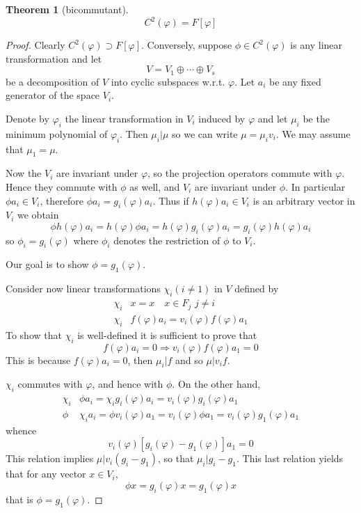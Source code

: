 \documentclass{book}
\newtheorem{theorem}{Theorem}[section]
\theoremstyle{definition}
\begin{document}
\begin{theorem}[bicommutant]
\[C^2(\varphi)=F[\varphi]\]
\end{theorem}
\begin{proof}
Clearly $C^2(\varphi)\supset F[\varphi]$. Conversely, suppose $\phi\in C^2(\varphi)$ is any linear transformation and let \[ V=V_1\oplus \cdots\oplus V_s\] be a decomposition of $V$ into cyclic subspaces w.r.t. $\varphi$. Let $a_i$ be any fixed generator of the space $V_i$.\par
Denote by $\varphi_i$ the linear transformation in $V_i$ induced by $\varphi$ and let $\mu_i$ be the minimum polynomial of $\varphi_i$. Then $\mu_i|\mu$ so we can write $\mu=\mu_i v_i$. We may assume that $\mu_1=\mu$.\par
Now the $V_i$ are invariant under $\varphi$, so the projection operators commute with $\varphi$. Hence they commute with $\phi$ as well, and $V_i$ are invariant under $\phi$. In particular $\phi a_i\in V_i$, therefore $\phi a_i=g_i(\varphi)a_i$. Thus if $h(\varphi)a_i\in V_i$ is an arbitrary vector in $V_i$ we obtain \[\phi h(\varphi)a_i=h(\varphi)\phi a_i=h(\varphi)g_i(\varphi)a_i=g_i(\varphi)h(\varphi)a_i\]
so $\phi_i=g_i(\varphi)$ where $\phi_i$ denotes the restriction of $\phi$ to $V_i$.\par
Our goal is to show $\phi=g_1(\varphi)$.\par
Consider now linear transformations $\chi_i(i\ne 1)$ in $V$ defined by 
\begin{align*}
\chi_i &x=x\quad x\in F_j\,\, j\ne i\\
\chi_i &f(\varphi)a_i=v_i(\varphi)f(\varphi)a_1
\end{align*}
To show that $\chi_i$ is well-defined it is sufficient to prove that 
\[f(\varphi)a_i=0\Longrightarrow v_i(\varphi)f(\varphi)a_1=0\]
This is because $f(\varphi)a_i=0$, then $\mu_i|f$ and so $\mu |v_if$.\par
$\chi_i$ commutes with $\varphi$, and hence with $\phi$. On the other hand, 
\begin{align*}
\chi_i&\phi a_i=\chi_i g_i(\varphi)a_i=v_i(\varphi)g_i(\varphi)a_1\\
\phi&\chi_i a_i=\phi v_i(\varphi)a_1=v_i(\varphi)\phi a_1=v_i(\varphi)g_1(\varphi)a_1
\end{align*}
whence \[v_i(\varphi)[g_i(\varphi)-g_1(\varphi)]a_1=0\]
This relation implies $\mu|v_i(g_i-g_1)$, so that $\mu_i|g_i-g_1$. This last relation yields that for any vector $x\in V_i$, \[\phi x=g_i(\varphi)x=g_1(\varphi)x\]that is $\phi=g_1(\varphi)$.
\end{proof}
\end{document}
